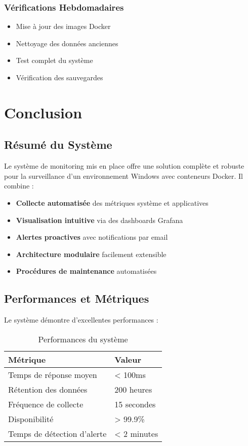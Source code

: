 \documentclass[12pt,a4paper]{report}
\begin{document}
\subsection{Vérifications Hebdomadaires}

\begin{itemize}
    \item Mise à jour des images Docker
    \item Nettoyage des données anciennes
    \item Test complet du système
    \item Vérification des sauvegardes
\end{itemize}

\chapter{Conclusion}

\section{Résumé du Système}

Le système de monitoring mis en place offre une solution complète et robuste pour la surveillance d'un environnement Windows avec conteneurs Docker. Il combine :

\begin{itemize}
    \item \textbf{Collecte automatisée} des métriques système et applicatives
    \item \textbf{Visualisation intuitive} via des dashboards Grafana
    \item \textbf{Alertes proactives} avec notifications par email
    \item \textbf{Architecture modulaire} facilement extensible
    \item \textbf{Procédures de maintenance} automatisées
\end{itemize}

\section{Performances et Métriques}

Le système démontre d'excellentes performances :

\begin{table}[H]
\centering
\begin{tabular}{|l|l|}
\hline
\textbf{Métrique} & \textbf{Valeur} \\
\hline
Temps de réponse moyen & < 100ms \\
\hline
Rétention des données & 200 heures \\
\hline
Fréquence de collecte & 15 secondes \\
\hline
Disponibilité & > 99.9\% \\
\hline
Temps de détection d'alerte & < 2 minutes \\
\hline
\end{tabular}
\caption{Performances du système}
\label{tab:performances}
\end{table}
\end{document}
